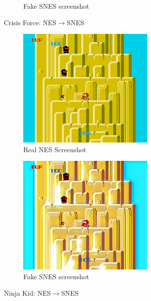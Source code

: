 \documentclass[10pt,twocolumn,letterpaper]{article}
\begin{document}
\begin{figure}[H]
\begin{subfigure}[b]{0.235\textwidth}
      \caption{Fake SNES screenshot}
      \label{fig:ss3b}
   \end{subfigure}
   \caption{Crisis Force: NES$\rightarrow$SNES}
   \label{fig:ss3}
\end{figure}

\begin{figure}[H]
   \centering
   \begin{subfigure}[b]{0.235\textwidth}
      \includegraphics[width=\textwidth, height=0.75\textwidth]{figures/nes_to_snes/Ninja_Kun_-_Majou_no_Bouken_(J)__ucc__8_real_A.png}
      \caption{Real NES Screenshot}
      \label{fig:ss4a}
   \end{subfigure}
   \begin{subfigure}[b]{0.235\textwidth}
      \includegraphics[width=\textwidth, height=0.75\textwidth]{figures/nes_to_snes/Ninja_Kun_-_Majou_no_Bouken_(J)__ucc__8_fake_B.png}
      \caption{Fake SNES screenshot}
      \label{fig:ss4b}
   \end{subfigure}
   \caption{Ninja Kid: NES$\rightarrow$SNES}
   \label{fig:ss4}
\end{figure}
\end{document}
